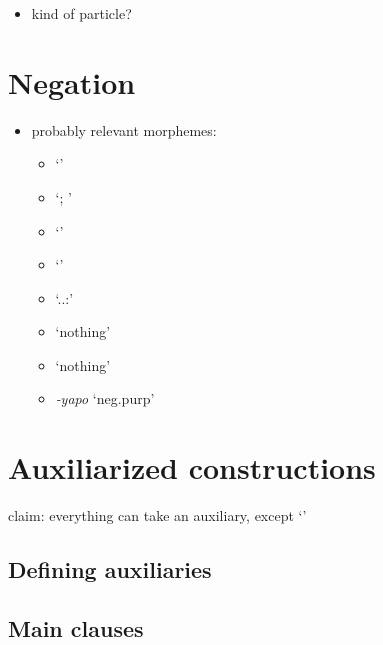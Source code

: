 \documentclass{memoir}
\begin{document}
\begin{itemize}
\tightlist
\item
  kind of particle?
\end{itemize}

\chapter{\texorpdfstring{Negation \label{negation}}{Negation }}

\begin{itemize}
\tightlist
\item
  probably relevant morphemes:

  \begin{itemize}
  \tightlist
  \item
     `'
  \item
     `; '
  \item
     `'
  \item
     `'
  \item
     `..:'
  \item
     `nothing'
  \item
     `nothing'
  \item
    \emph{‑yapo} `neg.purp'
  \end{itemize}
\end{itemize}

\chapter{Auxiliarized constructions}

claim: everything can take an auxiliary, except  `'


\section{Defining auxiliaries}

\section{Main clauses}
\end{document}
